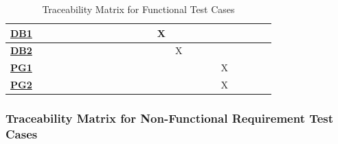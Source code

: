 \documentclass[12pt, titlepage]{article}
\begin{document}
\begin{table}[H]
\begin{adjustwidth}{-1.57in}{-1in}
{\begin{tabular}{c|c|c|c|c|c|c|c|c|c|c|c|c|c|c|c|c|c|c|c|c|c|c|}
\multicolumn{1}{|c|}{\hyperref[Test-DB1]{\textbf{DB1}}} &              &              &              &              &              &              &              &              &              &              &              &              &      X        &              &             &             &             &           & & & &   \\ \hline
\multicolumn{1}{|c|}{\hyperref[Test-DB2]{\textbf{DB2}}} &              &              &              &              &              &              &              &              &              &              &              &              &              &        X      &             &             &             &           & & & &   \\ \hline
\multicolumn{1}{|c|}{\hyperref[Test-PG1]{\textbf{PG1}}} &              &              &              &              &              &              &              &              &              &              &              &              &              &              &             &             &             &      X     & & & &   \\ \hline
\multicolumn{1}{|c|}{\hyperref[Test-PG2]{\textbf{PG2}}} &              &              &              &              &              &              &              &              &              &              &              &              &              &              &             &             &             &      X     & & & &   \\ \hline
\end{tabular}}
\caption{Traceability Matrix for Functional Test Cases}
    \label{tab:my_label}
\end{adjustwidth}
\end{table}

\subsubsection{Traceability Matrix for Non-Functional Requirement Test Cases}
\end{document}
